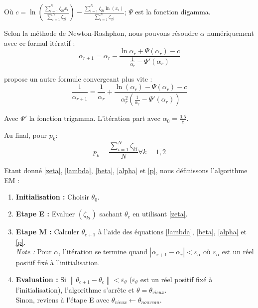 \documentclass[10pt,a4paper]{article}
\begin{document}
Où $c = \ln \left( {\frac{{\sum\limits_{i = 1}^N {{\zeta _{2i}}{x_i}} }}{{\sum\limits_{i = 1}^N {{\zeta _{2i}}} }}} \right) - \frac{{\sum\limits_{i = 1}^N {{\zeta _{2i}}\ln \left( {{x_i}} \right)} }}{{\sum\limits_{i = 1}^N {{\zeta _{2i}}} }}$; $\Psi$ est la fonction digamma.

Selon la méthode de Newton-Rashphon, nous pouvons résoudre $\alpha$ numériquement avec ce formul itératif :
\[{\alpha _{r + 1}} = {\alpha _r} - \frac{{\ln {\alpha _r} + \Psi \left( {{\alpha _r}} \right) - c}}{{\frac{1}{{{\alpha _r}}} - \Psi '\left( {{\alpha _r}} \right)}}\]

\cite{bib:gamma} propose un autre formule convergeant plus vite :
\begin{equation}
    \label{alpha}
    \frac{1}{{{\alpha _{r + 1}}}} = \frac{1}{{{\alpha _r}}} + \frac{{\ln \left( {{\alpha _r}} \right) - \Psi \left( {{\alpha _r}} \right) - c}}{{\alpha_r^2\left( {\frac{1}{{{\alpha _r}}} - \Psi '\left( {{\alpha _r}} \right)} \right)}}
\end{equation}

Avec $\Psi'$ la fonction trigamma. L'itération part avec ${\alpha _0} = \frac{{0.5}}{c}$.

Au final, pour $p_k$:
\begin{equation}
    \label{p}
    {p_k} = \frac{{\sum\limits_{i = 1}^N {{\zeta _{ki}}} }}{N}\forall k = \overline {1,2}
\end{equation}

Etant donné \eqref{zeta}, \eqref{lambda}, \eqref{beta}, \eqref{alpha} et \eqref{p}, nous définissons l'algorithme EM :
\begin{enumerate}
    \item \textbf{Initialisation :} Choisir $\theta_{0}$.
    \item \textbf{Etape E :} Evaluer $(\zeta_{ki})$ sachant $\theta_{c}$ en utilisant \eqref{zeta}.
    \item \textbf{Etape M :} Calculer $\theta_{c+1}$ à l'aide des équations \eqref{lambda}, \eqref{beta}, \eqref{alpha} et \eqref{p}. \\
    \emph{Note :} Pour $\alpha$, l'itération se termine quand $\left| {{\alpha _{r + 1}} - {\alpha _r}} \right| < {\varepsilon_\alpha }$ où $\varepsilon_\alpha$ est un réel positif fixé à l'initialisation.
    \item \textbf{Evaluation :} Si $\left\| {{\theta_{c + 1}} - {\theta_c}} \right\| < {\varepsilon _\theta }$ ($\varepsilon_\theta$ est un réel positif fixé à l'initialisation), l'algorithme s'arrête et $\theta = \theta_{vieux}$. \\ Sinon, reviens à l'étape E avec $\theta_{vieux} \leftarrow \theta_{nouveau}$.
\end{enumerate}
\end{document}
